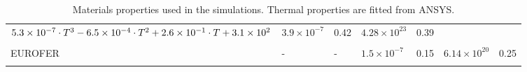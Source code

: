 \begin{table}
\begin{tabular}{p{1.7cm}  R{3cm}  R{3cm}  R{1.8cm}  R{1cm} R{1.8cm}  R{1cm}}
        $5.3\times 10^{-7}\cdot T^3\newline %
        -6.5\times 10^{-4}\cdot T^2\newline %
        +2.6\times 10^{-1}\cdot T\newline %
        +3.1\times 10^2$ & %

        $3.9\times 10^{-7}$ & %
        0.42&%
        $4.28\times 10^{23}$ & 0.39\\
        \\
        EUROFER \cite{aiello_hydrogen_2002} & %
        - & - &
        $1.5\times 10^{-7}$ & %
        0.15 & %
        $6.14\times 10^{20}$ & 0.25
        \\
        \\
    \end{tabular}
    \caption{Materials properties used in the simulations. Thermal properties are fitted from ANSYS.}
    \label{tab:materials properties_1}
\end{table}

